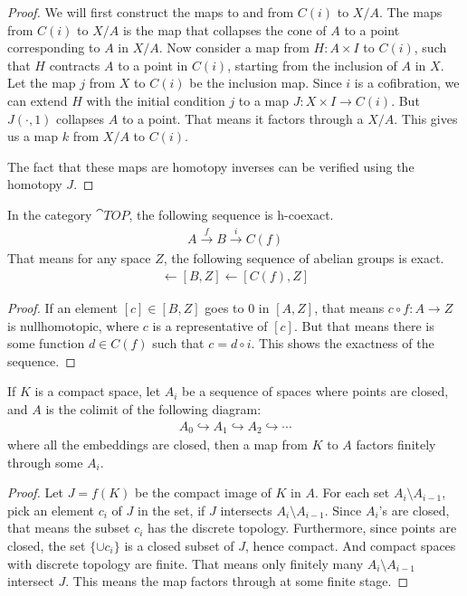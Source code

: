 \begin{proof}
  We will first construct the maps to and from $C(i)$ to $X/A$. The maps from $C(i)$ to $X/A$ is the
  map that collapses the cone of $A$ to a point corresponding to $A$ in $X/A$. Now consider a map
  from $H: A \times I$ to $C(i)$, such that $H$ contracts $A$ to a point in $C(i)$, starting from
  the inclusion of $A$ in $X$. Let the map $j$ from $X$ to $C(i)$ be the inclusion map. Since $i$ is
  a cofibration, we can extend $H$ with the initial condition $j$ to a map $J: X \times I \to
  C(i)$. But $J(\cdot, 1)$ collapses $A$ to a point. That means it factors through a $X/A$. This
  gives us a map $k$ from $X/A$ to $C(i)$.

  The fact that these maps are homotopy inverses can be verified  using the homotopy $J$.
\end{proof}

\begin{lem}
  In the category $\cat{TOP}$, the following sequence is h-coexact.
  \begin{align*}
    A \xrightarrow{f} B \xrightarrow{i} C(f)
  \end{align*}
  That means for any space $Z$, the following sequence of abelian groups is exact.
  \begin{align*}
    [A, Z] \leftarrow [B,Z] \leftarrow [C(f), Z]
  \end{align*}
\end{lem}

\begin{proof}
  If an element $[c] \in [B,Z]$ goes to $0$ in $[A, Z]$, that means $c \circ f: A \to Z$ is
  nullhomotopic, where $c$ is a representative of $[c]$. But that means there is some function
  $d \in C(f)$ such that $c = d \circ i$. This shows the exactness of the sequence.
\end{proof}

\begin{lem}
  If $K$ is a compact space, let $A_i$ be a sequence of spaces where points are closed, and $A$ is
  the colimit of the following diagram:
  \begin{align*}
    A_0 \hookrightarrow A_1 \hookrightarrow A_2 \hookrightarrow \cdots
  \end{align*}
  where all the embeddings are closed, then a map from $K$ to $A$ factors finitely through some
  $A_i$.
\end{lem}

\begin{proof}
  Let $J = f(K)$ be the compact image of $K$ in $A$. For each set $A_i \setminus A_{i-1}$, pick an
  element $c_i$ of $J$ in the set, if $J$ intersects $A_i \setminus A_{i-1}$. Since $A_i$'s are
  closed, that means the subset $c_i$ has the discrete topology. Furthermore, since points are
  closed, the set $\{\cup c_i\}$ is a closed subset of $J$, hence compact. And compact spaces with
  discrete topology are finite. That means only finitely many $A_i \setminus A_{i-1}$ intersect $J$.
  This means the map factors through at some finite stage.
\end{proof}

